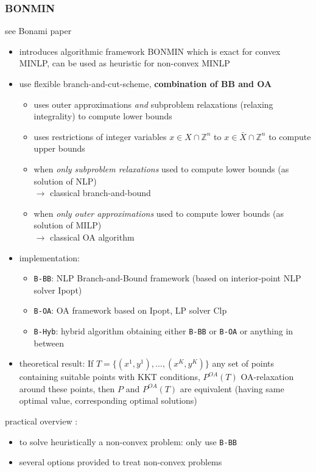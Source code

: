 \documentclass{article}
\begin{document}
\subsubsection{BONMIN}
see Bonami paper \cite{bonami2008algorithmic}
\begin{itemize}
\item introduces algorithmic framework BONMIN which is exact for convex MINLP, can be used as heuristic for non-convex MINLP
\item use flexible branch-and-cut-scheme, \textbf{combination of BB and OA}
	\begin{itemize}
	\item uses outer approximations \textit{and} subproblem relaxations (relaxing integrality) to compute lower bounds
	\item uses restrictions of integer variables $x\in X \cap \mathbb{Z}^n$ to $x\in \bar{X} \cap \mathbb{Z}^n$ to compute upper bounds
	\item when \emph{only subproblem relaxations} used to compute lower bounds (as solution of NLP) \\
	$\rightarrow$ classical branch-and-bound
	\item when \textit{only outer approximations} used to compute lower bounds (as solution of MILP) \\
	$\rightarrow$ classical OA algorithm
	\end{itemize}
\item implementation:
	\begin{itemize}
	\item \texttt{B-BB}: NLP Branch-and-Bound framework (based on interior-point NLP solver Ipopt)
	\item \texttt{B-OA}: OA framework based on Ipopt, LP solver Clp
	\item \texttt{B-Hyb}: hybrid algorithm obtaining either \texttt{B-BB} or \texttt{B-OA} or anything in between
	\end{itemize}
\item theoretical result: If $T=\{(x^1,y^1), ... ,(x^K,y^K)\}$ any set of points containing suitable points with KKT conditions, $P^{OA}(T)$ OA-relaxation around these points, then $P$ and $P^{OA}(T)$ are equivalent (having same optimal value, corresponding optimal solutions)
\end{itemize}
practical overview \cite{d2013mixed}:
\begin{itemize}
\item to solve heuristically a non-convex problem: only use \texttt{B-BB}
\item several options provided to treat non-convex problems
\end{itemize}
\end{document}
